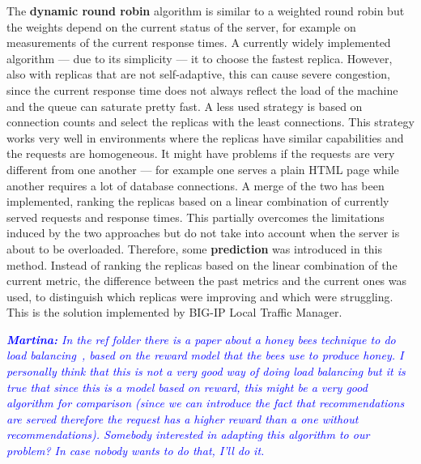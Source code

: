 The \textbf{dynamic round robin} algorithm is similar to a weighted
round robin but the weights depend on the current status of the
server, for example on measurements of the current response times. A
currently widely implemented algorithm --- due to its simplicity ---
it to choose the fastest replica. However, also with replicas that are
not self-adaptive, this can cause severe congestion, since the current
response time does not always reflect the load of the machine and the
queue can saturate pretty fast. A less used strategy is based on
connection counts and select the replicas with the least
connections. This strategy works very well in environments where the
replicas have similar capabilities and the requests are
homogeneous. It might have problems if the requests are very different
from one another --- for example one serves a plain HTML page while
another requires a lot of database connections. A merge of the two has
been implemented, ranking the replicas based on a linear combination
of currently served requests and response times. This partially
overcomes the limitations induced by the two approaches but do not
take into account when the server is about to be
overloaded. Therefore, some \textbf{prediction} was introduced in this
method. Instead of ranking the replicas based on the linear
combination of the current metric, the difference between the past
metrics and the current ones was used, to distinguish which replicas
were improving and which were struggling. This is the solution
implemented by BIG-IP Local Traffic Manager.

\textcolor{blue}{\textit{\textbf{Martina:} In the ref folder there is
    a paper about a honey bees technique to do load
    balancing~\cite{BeesBased:ADAPTIVE}, based on the reward model
    that the bees use to produce honey. I personally think that this
    is not a very good way of doing load balancing but it is true that
    since this is a model based on reward, this might be a very good
    algorithm for comparison (since we can introduce the fact that
    recommendations are served therefore the request has a higher
    reward than a one without recommendations). Somebody interested in
    adapting this algorithm to our problem? In case nobody wants to do
    that, I'll do it.}}
